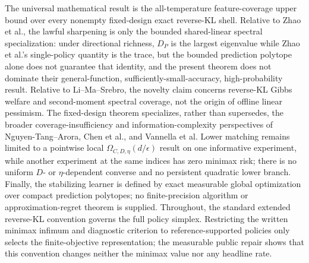 \documentclass{article}
\begin{document}
The universal mathematical result is the all-temperature feature-coverage upper bound over every nonempty fixed-design exact reverse-KL shell. Relative to Zhao et al., the lawful sharpening is only the bounded shared-linear spectral specialization: under directional richness, \(D_P\) is the largest eigenvalue while Zhao et al.'s single-policy quantity is the trace, but the bounded prediction polytope alone does not guarantee that identity, and the present theorem does not dominate their general-function, sufficiently-small-accuracy, high-probability result. Relative to Li--Ma--Srebro, the novelty claim concerns reverse-KL Gibbs welfare and second-moment spectral coverage, not the origin of offline linear pessimism. The fixed-design theorem specializes, rather than supersedes, the broader coverage-insufficiency and information-complexity perspectives of Nguyen-Tang--Arora, Chen et al., and Vannella et al. Lower matching remains limited to a pointwise local \(\Omega_{C,D,\eta}(d/\epsilon)\) result on one informative experiment, while another experiment at the same indices has zero minimax risk; there is no uniform \(D\)- or \(\eta\)-dependent converse and no persistent quadratic lower branch. Finally, the stabilizing learner is defined by exact measurable global optimization over compact prediction polytopes; no finite-precision algorithm or approximation-regret theorem is supplied. Throughout, the standard extended reverse-KL convention governs the full policy simplex. Restricting the written minimax infimum and diagnostic criterion to reference-supported policies only selects the finite-objective representation; the measurable public repair shows that this convention changes neither the minimax value nor any headline rate.
\end{document}
